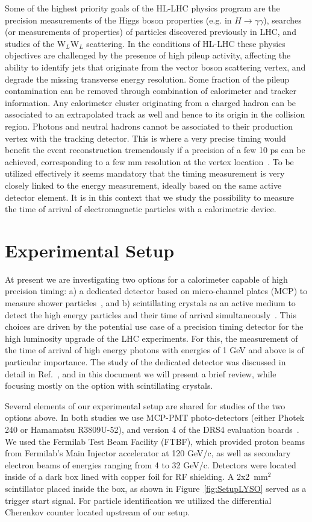 \documentclass[11pt]{article}
\begin{document}
Some of the highest priority goals of the HL-LHC physics program are the
precision measurements of the Higgs boson properties (e.g. in
$H\to\gamma\gamma$), searches (or measurements of properties) of particles
discovered previously in LHC, and studies of the W$_L$W$_L$ scattering. In the
conditions of HL-LHC these physics objectives are challenged by the presence of
high pileup activity, affecting the ability to identify jets that originate from
the vector boson scattering vertex, and degrade the missing transverse energy
resolution. Some fraction of the pileup contamination can be removed through
combination of calorimeter and tracker information. Any calorimeter cluster
originating from a charged hadron can be associated to an extrapolated track as
well and hence to its origin in the collision region. Photons and neutral
hadrons cannot be associated to their production vertex with the tracking
detector. This is where a very precise timing would benefit the event
reconstruction tremendously if a precision of a few 10 ps can be achieved,
corresponding to a few mm resolution at the vertex location~\cite{AdiCalor14}.
To be utilized effectively it seems mandatory that the timing measurement is
very closely linked to the energy measurement, ideally based on the same active
detector element. It is in this context that we study the possibility to measure
the time of arrival of electromagnetic particles with a calorimetric device.

\section{Experimental Setup}
At present we are investigating two options for a calorimeter capable of high
precision timing: a) a dedicated detector based on micro-channel plates (MCP) to
measure shower particles~\cite{MCPFastCaloNIMA}, and b) scintillating crystals
as an active medium to detect the high energy particles and their time of
arrival simultaneously~\cite{AdiCalor14}. This choices are driven by the
potential use case of a precision timing detector for the high luminosity
upgrade of the LHC experiments. For this, the measurement of the time of arrival
of high energy photons with energies of 1 GeV and above is of particular
importance. The study of the dedicated detector was discussed in detail in
Ref.~\cite{MCPFastCaloNIMA}, and in this document we will present a brief
review, while focusing mostly on the option with scintillating crystals. 

Several elements of our experimental setup are shared for studies of the two
options above. In both studies we use MCP-PMT photo-detectors (either Photek 240
or Hamamatsu R3809U-52), and version 4 of the DRS4 evaluation
boards~\cite{DRS4}. We used the Fermilab Test Beam Facility (FTBF), which
provided proton beams from Fermilab's Main Injector accelerator at 120 GeV/c, as
well as secondary electron beams of energies ranging from 4 to 32 GeV/c.
Detectors were located inside of a dark box lined with copper foil for RF
shielding. A 2x2~mm$^2$ scintillator placed inside the box, as shown in
Figure~\ref{fig:SetupLYSO} served as a trigger start signal. For particle
identification we utilized the differential Cherenkov counter located upstream
of our setup.
\end{document}
